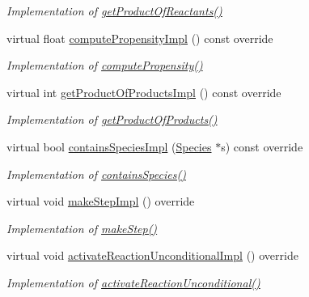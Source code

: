 \begin{DoxyCompactItemize}
\begin{DoxyCompactList}\small\item\em Implementation of \hyperlink{classReactionBase_a6cbc412e6a43d7a6e3c036dfe6ec773a}{get\+Product\+Of\+Reactants()} \end{DoxyCompactList}\item 
virtual float \hyperlink{classReaction_a9052e2ceaddc6f2ea045c17a7a0276b5}{compute\+Propensity\+Impl} () const override
\begin{DoxyCompactList}\small\item\em Implementation of \hyperlink{classReactionBase_a45c31c853c6db84ab472816a64528f98}{compute\+Propensity()} \end{DoxyCompactList}\item 
virtual int \hyperlink{classReaction_a1f6c71176818a6dc76c0a69bb0e277ed}{get\+Product\+Of\+Products\+Impl} () const override
\begin{DoxyCompactList}\small\item\em Implementation of \hyperlink{classReactionBase_a963d733e68de253074a077507c4f2be0}{get\+Product\+Of\+Products()} \end{DoxyCompactList}\item 
virtual bool \hyperlink{classReaction_a70666182f28e2a5988f836e1795db0b6}{contains\+Species\+Impl} (\hyperlink{classSpecies}{Species} $\ast$s) const override
\begin{DoxyCompactList}\small\item\em Implementation of \hyperlink{classReactionBase_a35529ea77cfafcf83842c0d27dff0159}{contains\+Species()} \end{DoxyCompactList}\item 
virtual void \hyperlink{classReaction_af26f6db3ea0425d6f7782b653358118c}{make\+Step\+Impl} () override
\begin{DoxyCompactList}\small\item\em Implementation of \hyperlink{classReactionBase_a565e2d5fac7efaf63f19dab909428882}{make\+Step()} \end{DoxyCompactList}\item 
virtual void \hyperlink{classReaction_ac21034442113a1e5b73d13695aea5fce}{activate\+Reaction\+Unconditional\+Impl} () override
\begin{DoxyCompactList}\small\item\em Implementation of \hyperlink{classReactionBase_ad5392e82411e5413eddb7e45124cd11f}{activate\+Reaction\+Unconditional()} \end{DoxyCompactList}\item 

\end{DoxyCompactItemize}
